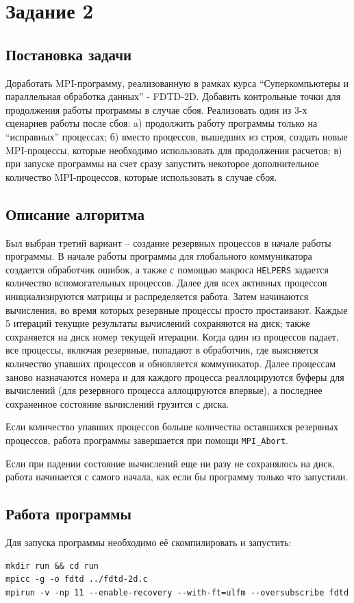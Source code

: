 \documentclass[a4paper,12pt,titlepage,finall]{article}
\begin{document}
\newpage

\section{Задание 2}
\subsection{Постановка задачи}

Доработать MPI-программу, реализованную в рамках курса
“Суперкомпьютеры и параллельная обработка данных” - FDTD-2D. Добавить
контрольные точки для продолжения работы программы в случае сбоя. Реализовать
один из 3-х сценариев работы после сбоя: a) продолжить работу программы только
на “исправных” процессах; б) вместо процессов, вышедших из строя, создать новые
MPI-процессы, которые необходимо использовать для продолжения расчетов; в) при
запуске программы на счет сразу запустить некоторое дополнительное количество
MPI-процессов, которые использовать в случае сбоя.

\subsection{Описание алгоритма}

Был выбран третий вариант -- создание резервных процессов в начале работы
программы. В начале работы
программы для глобального коммуникатора создается обработчик ошибок, а также
с помощью макроса \texttt{HELPERS} задается количество вспомогательных
процессов. Далее для всех активных процессов инициализируются матрицы и
распределяется работа. Затем начинаются вычисления, во время которых резервные
процессы просто простаивают. Каждые 5 итераций текущие результаты вычислений
сохраняются на диск; также сохраняется на диск номер текущей итерации. Когда
один из процессов падает, все процессы, включая резервные, попадают в
обработчик, где выясняется количество упавших процессов и обновляется
коммуникатор. Далее процессам заново назначаются номера и для каждого процесса
реаллоцируются буферы для вычислений (для резервного процесса аллоцируются
впервые), а последнее сохраненное состояние вычислений грузится с диска.

Если количество упавших процессов больше количества оставшихся резервных
процессов, работа программы завершается при помощи \texttt{MPI\_Abort}.

Если при падении состояние вычислений еще ни разу не сохранялось на диск, работа
начинается с самого начала, как если бы программу только что запустили.

\subsection{Работа программы}

Для запуска программы необходимо её скомпилировать и запустить:

\begin{lstlisting}
mkdir run && cd run
mpicc -g -o fdtd ../fdtd-2d.c
mpirun -v -np 11 --enable-recovery --with-ft=ulfm --oversubscribe fdtd
\end{lstlisting}
\end{document}
